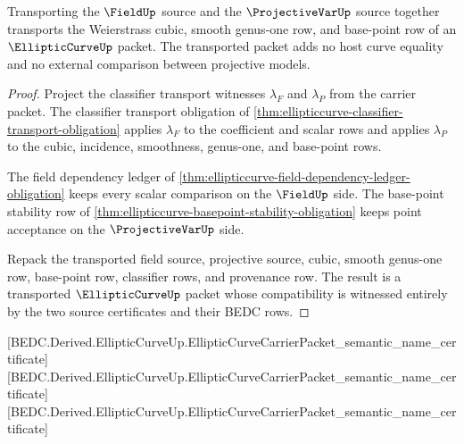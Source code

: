\begin{theorem}
\label{thm:ellipticcurve-field-projective-source-compatibility}
Transporting the $\FieldUp$ source and the $\ProjectiveVarUp$ source together transports the Weierstrass cubic, smooth genus-one row, and base-point row of an $\EllipticCurveUp$ packet. The transported packet adds no host curve equality and no external comparison between projective models.
\end{theorem}
\begin{proof}
Project the classifier transport witnesses $\lambda_F$ and $\lambda_P$ from the carrier packet. The classifier transport obligation of \autoref{thm:ellipticcurve-classifier-transport-obligation} applies $\lambda_F$ to the coefficient and scalar rows and applies $\lambda_P$ to the cubic, incidence, smoothness, genus-one, and base-point rows.

The field dependency ledger of \autoref{thm:ellipticcurve-field-dependency-ledger-obligation} keeps every scalar comparison on the $\FieldUp$ side. The base-point stability row of \autoref{thm:ellipticcurve-basepoint-stability-obligation} keeps point acceptance on the $\ProjectiveVarUp$ side.

Repack the transported field source, projective source, cubic, smooth genus-one row, base-point row, classifier rows, and provenance row. The result is a transported $\EllipticCurveUp$ packet whose compatibility is witnessed entirely by the two source certificates and their BEDC rows.
\end{proof}

[BEDC.Derived.EllipticCurveUp.EllipticCurveCarrierPacket\_semantic\_name\_certificate]
[BEDC.Derived.EllipticCurveUp.EllipticCurveCarrierPacket\_semantic\_name\_certificate]
[BEDC.Derived.EllipticCurveUp.EllipticCurveCarrierPacket\_semantic\_name\_certificate]

